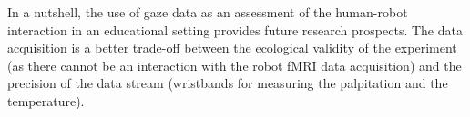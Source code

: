 \documentclass{sig-alternate}
\begin{document}
%

In a nutshell, the use of gaze data as an assessment of the human-robot
interaction in an educational setting provides future research
prospects. The data acquisition is a better trade-off between the
ecological validity of the experiment (as there cannot be an interaction
with the robot fMRI data acquisition) and the precision of the data
stream (wristbands for measuring the palpitation and the temperature).



%




\balancecolumns
\end{document}
